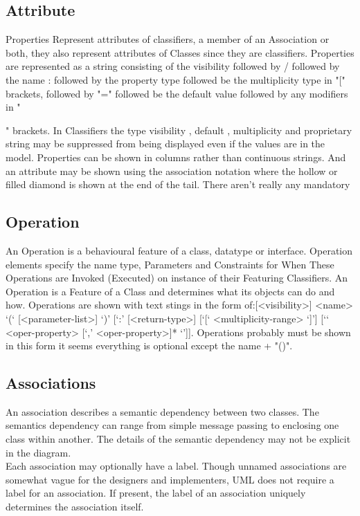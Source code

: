 \subsection{Attribute}
Properties Represent attributes of classifiers, a member of an Association or both, they also represent attributes of Classes since they are classifiers. Properties are represented as a string consisting of the visibility followed by / followed by the name : followed by the property type followed be the multiplicity type in "[" brackets, followed by "=" followed be the default value followed by any modifiers in "{" brackets. In Classifiers the type visibility , default , multiplicity and proprietary string may be suppressed from being displayed even if the values are in the model. Properties can be shown in columns rather than continuous strings. And an attribute may be shown using the association notation where the hollow or filled diamond is shown at the end of the tail. There aren't really any mandatory
\subsection{Operation}
An Operation is a behavioural feature of a class, datatype or interface. Operation elements specify the name type, Parameters and Constraints for When These Operations are Invoked (Executed) on instance of their Featuring Classifiers. An Operation is a Feature of a Class and determines what its objects can do and how. Operations are shown with text stings in the form of:[<visibility>] <name> ‘(‘ [<parameter-list>] ‘)’ [‘:’ [<return-type>] [‘[‘ <multiplicity-range> ‘]’] [‘{‘ <oper-property> [‘,’ <oper-property>]* ‘}’]]. Operations probably must be shown in this form it seems everything is optional except the name + "()".

\subsection{Associations}
An association describes a semantic dependency between two classes. The semantics dependency can range from simple message passing to enclosing one class within another. The details of the semantic dependency may not be explicit in the diagram.\\

 Each association may optionally have a label. Though unnamed associations are somewhat vague for the designers and implementers, UML does not require a label for an association. If present, the label of an association uniquely determines the association itself.\\ 
 
}
